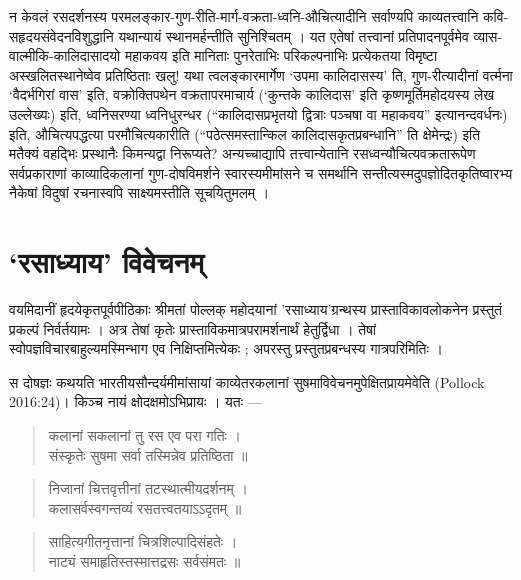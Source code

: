{\dev न केवलं रसदर्शनस्य परमलङ्कार-गुण-रीति-मार्ग-वक्रता-ध्वनि-औचित्यादीनि सर्वाण्यपि काव्यतत्त्वानि कवि-सहृदयसंवेदनविशुद्धानि यथान्यायं स्थानमर्हन्तीति सुनिश्चितम् । यत एतेषां तत्त्वानां प्रतिपादनपूर्वमेव व्यास-वाल्मीकि-कालिदासादयो महाकवय इति मानिताः पुनरेताभिः परिकल्पनाभिः प्रत्येकतया विमृष्टा अस्खलितस्थानेष्वेव प्रतिष्ठिताः खलु! यथा त्वलङ्कारमार्गेण `उपमा कालिदासस्य' ति, गुण-रीत्यादीनां वर्त्मना `वैदर्भगिरां वास' इति, वक्रोक्तिपथेन वक्रतापरमाचार्य (`कुन्तके कालिदास' इति कृष्णमूर्तिमहोदयस्य लेख उल्लेख्यः) इति, ध्वनिसरण्या ध्वनिधुरन्धर (``कालिदासप्रभृतयो द्वित्राः पञ्चषा वा महाकवय'' इत्यानन्दवर्धनः) इति, औचित्यपद्धत्या परमौचित्यकारीति (``पठेत्समस्तान्किल कालिदासकृतप्रबन्धानि'' ति क्षेमेन्द्रः) इति मतैक्यं वहद्भिः प्रस्थानैः किमन्यद्वा निरूप्यते? अन्यच्चाद्यापि तत्त्वान्येतानि रसध्वन्यौचित्यवक्रतारूपेण सर्वप्रकाराणां काव्यादिकलानां गुण-दोषविमर्शने स्वारस्यमीमांसने च समर्थानि सन्तीत्यस्मदुपज्ञोदितकृतिष्वारभ्य नैकेषां विदुषां रचनास्वपि साक्ष्यमस्तीति सूचयितुमलम् ।} 

\section*{{\dev `रसाध्याय' विवेचनम्}}

{\dev वयमिदानीं हृदयेकृतपूर्वपीठिकाः श्रीमतां पोल्लक् महोदयानां ’रसाध्याय’ग्रन्थस्य प्रास्ताविकाव\-लोकनेन प्रस्तुतं प्रकल्पं निर्वर्तयामः । अत्र तेषां कृतेः प्रास्ताविकमात्रपरामर्शनार्थं हेतुर्द्विधा । तेषां स्वोपज्ञविचारबाहुल्यमस्मिन्भाग एव निक्षिप्तमित्येकः ; अपरस्तु प्रस्तुतप्रबन्धस्य गात्र\-परिमितिः ।}

{\dev स दोषज्ञः कथयति भारतीयसौन्दर्यमीमांसायां काव्येतरकलानां सुषमाविवेचनमुपेक्षितप्राय\-मेवेति} (Pollock 2016:24){\dev । किञ्च नायं क्षोदक्षमोऽभिप्रायः । यतः ---}  
\begin{quote}
{\dev कलानां सकलानां तु रस एव परा गतिः ।}\\
{\dev संस्कृतेः सुषमा सर्वा तस्मिन्नेव प्रतिष्ठिता ॥}
\end{quote}
\begin{quote}
{\dev निजानां चित्तवृत्तीनां तटस्थात्मीयदर्शनम् ।}\\
{\dev कलासर्वस्वगन्तव्यं रसतत्त्वतयाऽऽदृतम् ॥}
\end{quote}
\begin{quote}
{\dev साहित्यगीतनृत्तानां चित्रशिल्पादिसंहतेः ।}\\
{\dev नाट्यं समाहृतिस्तस्मात्तद्रसः सर्वसंमतः ॥}
\end{quote}

